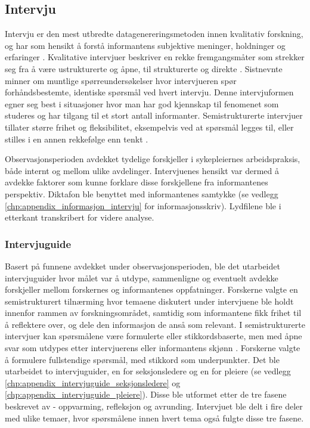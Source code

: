\subsection{Intervju}
\label{sec:intervju}
Intervju er den mest utbredte datagenereringsmetoden innen kvalitativ forskning, og har som hensikt å forstå informantens subjektive meninger, holdninger og erfaringer \citep{Tjora}. Kvalitative intervjuer beskriver en rekke fremgangsmåter som strekker seg fra å være ustrukturerte og åpne, til strukturerte og direkte \citep{Smith12}. Sistnevnte minner om muntlige spørreundersøkelser hvor intervjueren spør forhåndsbestemte, identiske spørsmål ved hvert intervju. Denne intervjuformen egner seg best i situasjoner hvor man har god kjennskap til fenomenet som studeres og har tilgang til et stort antall informanter. Semistrukturerte intervjuer tillater større frihet og fleksibilitet, eksempelvis ved at spørsmål legges til, eller stilles i en annen rekkefølge enn tenkt \citep{Tjora}.
 
\noindent
Observasjonsperioden avdekket tydelige forskjeller i sykepleiernes arbeidspraksis, både internt og mellom ulike avdelinger. Intervjuenes hensikt var dermed å avdekke faktorer som kunne forklare disse forskjellene fra informantenes perspektiv. Diktafon ble benyttet med informantenes samtykke (se vedlegg \ref{chp:appendix_informasjon_intervju} for informasjonsskriv). Lydfilene ble i etterkant transkribert for videre analyse.
 
\subsubsection{Intervjuguide}
Basert på funnene avdekket under observasjonsperioden, ble det utarbeidet intervjuguider hvor målet var å utdype, sammenligne og eventuelt avdekke forskjeller mellom forskernes og informantenes oppfatninger. Forskerne valgte en semistrukturert tilnærming hvor temaene diskutert under intervjuene ble holdt innenfor rammen av forskningsområdet, samtidig som informantene fikk frihet til å reflektere over, og dele den informasjon de anså som relevant.
I semistrukturerte intervjuer kan spørsmålene være formulerte eller stikkordsbaserte, men med åpne svar som utdypes etter intervjuerens eller informantens skjønn \citep{Schensul99}. Forskerne valgte å formulere fullstendige spørsmål, med stikkord som underpunkter. Det ble utarbeidet to intervjuguider, en for seksjonsledere og en for pleiere (se vedlegg \ref{chp:appendix_intervjuguide_seksjonsledere} og \ref{chp:appendix_intervjuguide_pleiere}). Disse ble utformet etter de tre fasene beskrevet av \citet{Tjora} - oppvarming, refleksjon og avrunding. Intervjuet ble delt i fire deler med ulike temaer, hvor spørsmålene innen hvert tema også fulgte disse tre fasene.
 
